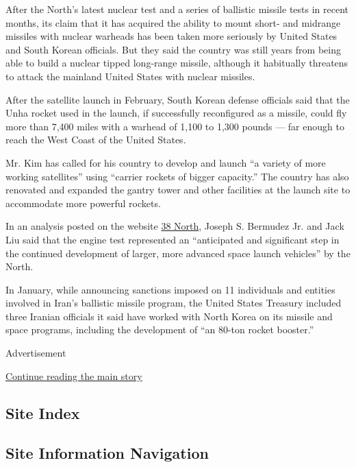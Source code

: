 After the North's latest nuclear test and a series of ballistic missile
tests in recent months, its claim that it has acquired the ability to
mount short- and midrange missiles with nuclear warheads has been taken
more seriously by United States and South Korean officials. But they
said the country was still years from being able to build a nuclear
tipped long-range missile, although it habitually threatens to attack
the mainland United States with nuclear missiles.

After the satellite launch in February, South Korean defense officials
said that the Unha rocket used in the launch, if successfully
reconfigured as a missile, could fly more than 7,400 miles with a
warhead of 1,100 to 1,300 pounds --- far enough to reach the West Coast
of the United States.

Mr. Kim has called for his country to develop and launch ``a variety of
more working satellites'' using ``carrier rockets of bigger capacity.''
The country has also renovated and expanded the gantry tower and other
facilities at the launch site to accommodate more powerful rockets.

In an analysis posted on the website \href{http://38north.org/}{38
North}, Joseph S. Bermudez Jr. and Jack Liu said that the engine test
represented an ``anticipated and significant step in the continued
development of larger, more advanced space launch vehicles'' by the
North.

In January, while announcing sanctions imposed on 11 individuals and
entities involved in Iran's ballistic missile program, the United States
Treasury included three Iranian officials it said have worked with North
Korea on its missile and space programs, including the development of
``an 80-ton rocket booster.''

Advertisement

\protect\hyperlink{after-bottom}{Continue reading the main story}

\hypertarget{site-index}{%
\subsection{Site Index}\label{site-index}}

\hypertarget{site-information-navigation}{%
\subsection{Site Information
Navigation}\label{site-information-navigation}}

